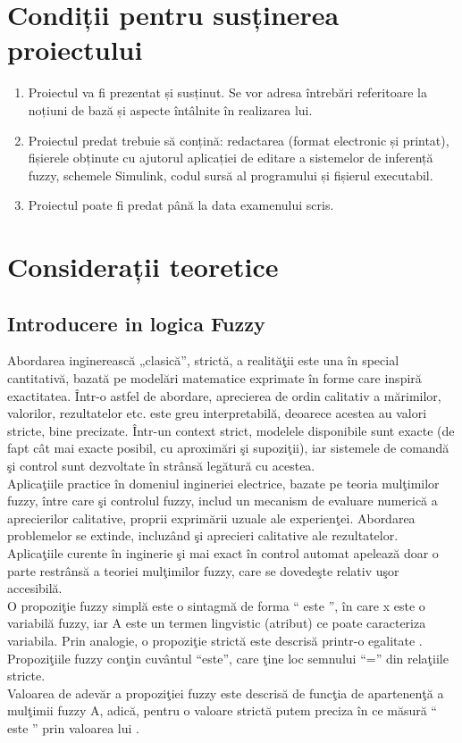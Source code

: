 \documentclass[11pt]{article}
\begin{document}
\section{Condiții pentru susținerea proiectului}
\begin{enumerate}[label=\alph*)]
	\item Proiectul va fi prezentat și susținut. Se vor adresa întrebări referitoare la noțiuni de bază și aspecte întâlnite în realizarea lui.
	\item Proiectul predat trebuie să conțină: redactarea (format electronic și printat), fișierele obținute cu ajutorul aplicației de editare a sistemelor de inferență fuzzy, schemele Simulink, codul sursă al programului și fișierul executabil.
	\item Proiectul poate fi predat până la data examenului scris.
\end{enumerate}
\newpage
\section{Considerații teoretice}
\subsection{Introducere in logica Fuzzy}
Abordarea inginerească „clasică”, strictă, a realităţii este una în special cantitativă, bazată pe
modelări matematice exprimate în forme care inspiră exactitatea. Într-o astfel de abordare,
aprecierea de ordin calitativ a mărimilor, valorilor, rezultatelor etc. este greu interpretabilă,
deoarece acestea au valori stricte, bine precizate. Într-un context strict, modelele disponibile
sunt exacte (de fapt cât mai exacte posibil, cu aproximări şi supoziţii), iar sistemele de
comandă şi control sunt dezvoltate în strânsă legătură cu acestea.
\\
Aplicaţiile practice în domeniul ingineriei electrice, bazate pe teoria mulţimilor fuzzy, între
care şi controlul fuzzy, includ un mecanism de evaluare numerică a aprecierilor calitative,
proprii exprimării uzuale ale experienţei. Abordarea problemelor se extinde, incluzând şi
aprecieri calitative ale rezultatelor.
\\
Aplicaţiile curente în inginerie şi mai exact în control automat apelează doar o parte restrânsă a teoriei mulţimilor fuzzy, care se dovedeşte relativ uşor accesibilă.
\\
O propoziţie fuzzy simplă este o sintagmă de forma “ este ”, în care x este o variabilă fuzzy, iar A este un termen lingvistic (atribut) ce poate caracteriza variabila. Prin analogie, o propoziţie strictă este descrisă printr-o egalitate . Propoziţiile fuzzy conţin cuvântul “este”, care ţine loc semnului “=” din relaţiile stricte.
\\
Valoarea de adevăr a propoziţiei fuzzy este descrisă de funcţia de apartenenţă a mulţimii fuzzy A, adică, pentru o valoare strictă putem preciza în ce măsură “ este ” prin valoarea lui .
\end{document}
